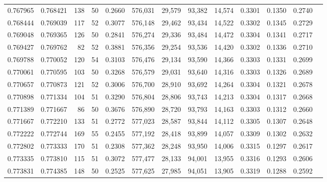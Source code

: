 \begin{tabular}{rrrrrrrrrrrrr}
0.767965 & 0.768421 &    138 &    50 &                                     0.2660 & 576,031 &  29,579 &  93,382 &  14,574 & 0.3301 & 0.1350 & 0.2740 \\
0.768444 & 0.769039 &    117 &    52 &                                     0.3077 & 576,148 &  29,462 &  93,434 &  14,522 & 0.3302 & 0.1345 & 0.2729 \\
0.769048 & 0.769365 &    126 &    50 &                                     0.2841 & 576,274 &  29,336 &  93,484 &  14,472 & 0.3304 & 0.1341 & 0.2717 \\
0.769427 & 0.769762 &     82 &    52 &                                     0.3881 & 576,356 &  29,254 &  93,536 &  14,420 & 0.3302 & 0.1336 & 0.2710 \\
0.769788 & 0.770052 &    120 &    54 &                                     0.3103 & 576,476 &  29,134 &  93,590 &  14,366 & 0.3303 & 0.1331 & 0.2699 \\
0.770061 & 0.770595 &    103 &    50 &                                     0.3268 & 576,579 &  29,031 &  93,640 &  14,316 & 0.3303 & 0.1326 & 0.2689 \\
0.770657 & 0.770873 &    121 &    52 &                                     0.3006 & 576,700 &  28,910 &  93,692 &  14,264 & 0.3304 & 0.1321 & 0.2678 \\
0.770898 & 0.771334 &    104 &    51 &                                     0.3290 & 576,804 &  28,806 &  93,743 &  14,213 & 0.3304 & 0.1317 & 0.2668 \\
0.771389 & 0.771667 &     86 &    50 &                                     0.3676 & 576,890 &  28,720 &  93,793 &  14,163 & 0.3303 & 0.1312 & 0.2660 \\
0.771667 & 0.772210 &    133 &    51 &                                     0.2772 & 577,023 &  28,587 &  93,844 &  14,112 & 0.3305 & 0.1307 & 0.2648 \\
0.772222 & 0.772744 &    169 &    55 &                                     0.2455 & 577,192 &  28,418 &  93,899 &  14,057 & 0.3309 & 0.1302 & 0.2632 \\
0.772802 & 0.773333 &    170 &    51 &                                     0.2308 & 577,362 &  28,248 &  93,950 &  14,006 & 0.3315 & 0.1297 & 0.2617 \\
0.773335 & 0.773810 &    115 &    51 &                                     0.3072 & 577,477 &  28,133 &  94,001 &  13,955 & 0.3316 & 0.1293 & 0.2606 \\
0.773831 & 0.774385 &    148 &    50 &                                     0.2525 & 577,625 &  27,985 &  94,051 &  13,905 & 0.3319 & 0.1288 & 0.2592 \\

\end{tabular}
